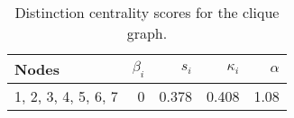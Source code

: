 \begin{table}
\centering
\caption{\label{tab:clique}Distinction centrality scores for the clique graph.}
\centering
\begin{tabular}[t]{lrrrr}
\toprule
Nodes & $\beta_i$ & $s_i$ & $\kappa_i$ & $\alpha$\\
\midrule
1, 2, 3, 4, 5, 6, 7 & 0 & 0.378 & 0.408 & 1.08\\
\bottomrule
\end{tabular}
\end{table}
